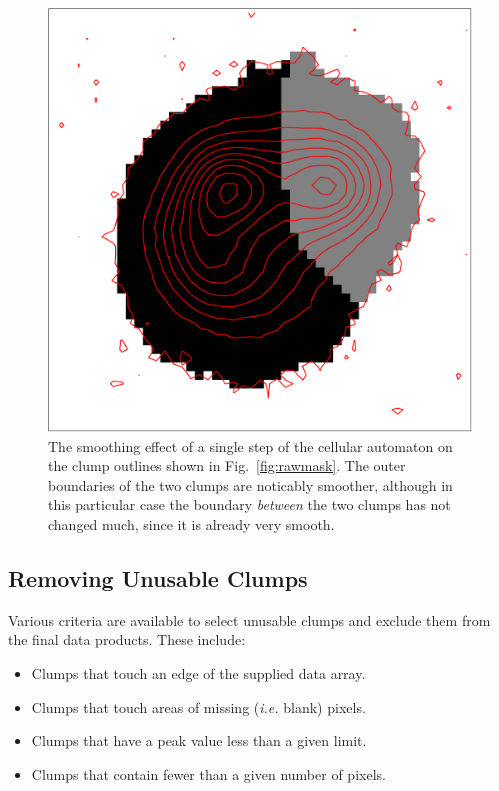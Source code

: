 \documentclass[final,authoryear,5p,times,twocolumn]{elsarticle}
\begin{document}
\begin{figure}
\includegraphics[width=\columnwidth]{cleaned}
\caption{The smoothing effect of a single step of the cellular automaton
on the clump outlines shown in Fig.~\ref{fig:rawmask}. The outer
boundaries of the two clumps are noticably smoother, although in this
particular case the boundary \emph{between} the two clumps has not
changed much, since it is already very smooth.}
\label{fig:cleanedmask}
\end{figure}

\subsection{Removing Unusable Clumps}
Various criteria are available to select unusable clumps and exclude them
from the final data products. These include:

\begin{itemize}
\item Clumps that touch an edge of the supplied data array.
\item Clumps that touch areas of missing (\emph{i.e.} blank) pixels.
\item Clumps that have a peak value less than a given limit.
\item Clumps that contain fewer than a given number of pixels.
\end{itemize}
\end{document}
